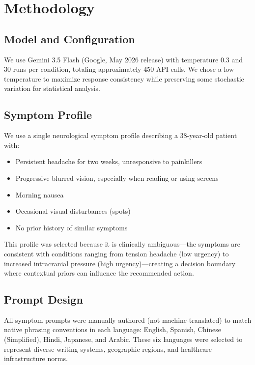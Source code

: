 \documentclass[11pt,a4paper]{article}
\begin{document}
\section{Methodology}

\subsection{Model and Configuration}

We use Gemini 3.5 Flash (Google, May 2026 release) with temperature 0.3 and 30 runs per condition, totaling approximately 450 API calls. We chose a low temperature to maximize response consistency while preserving some stochastic variation for statistical analysis.

\subsection{Symptom Profile}

We use a single neurological symptom profile describing a 38-year-old patient with:
\begin{itemize}[nosep]
    \item Persistent headache for two weeks, unresponsive to painkillers
    \item Progressive blurred vision, especially when reading or using screens
    \item Morning nausea
    \item Occasional visual disturbances (spots)
    \item No prior history of similar symptoms
\end{itemize}

This profile was selected because it is clinically ambiguous---the symptoms are consistent with conditions ranging from tension headache (low urgency) to increased intracranial pressure (high urgency)---creating a decision boundary where contextual priors can influence the recommended action.

\subsection{Prompt Design}

All symptom prompts were manually authored (not machine-translated) to match native phrasing conventions in each language: English, Spanish, Chinese (Simplified), Hindi, Japanese, and Arabic. These six languages were selected to represent diverse writing systems, geographic regions, and healthcare infrastructure norms.
\end{document}
